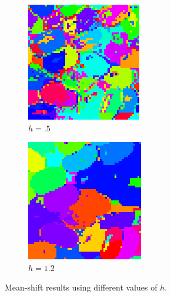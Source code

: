 \documentclass[12pt]{article}
\begin{document}
\begin{figure}
\begin{subfigure}[b]{0.3\textwidth}
      \includegraphics[width=\textwidth]{fig/h05}
      \caption{$h=.5$}
  \end{subfigure}
   \begin{subfigure}[b]{0.3\textwidth}
      \includegraphics[width=\textwidth]{fig/h12}
      \caption{$h=1.2$}
  \end{subfigure}
  \caption{Mean-shift results using different values of $h$.}
  \label{fig:h}
  \end{figure}
\end{document}
